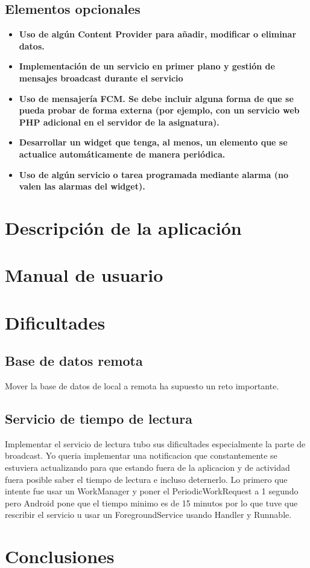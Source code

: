 \documentclass[a4paper,10pt]{report}
\begin{document}
    \section{Elementos opcionales}
      \begin{itemize}
        \item \textbf{Uso de algún Content Provider para añadir, modificar o eliminar datos.}
        \item \textbf{Implementación de un servicio en primer plano y gestión de mensajes broadcast durante el servicio}
        \item \textbf{Uso de mensajería FCM. Se debe incluir alguna forma de que se pueda probar de forma externa (por ejemplo, con un servicio web PHP adicional en el servidor de la asignatura).}
        \item \textbf{Desarrollar un widget que tenga, al menos, un elemento que se actualice automáticamente de manera periódica.}
        \item \textbf{Uso de algún servicio o tarea programada mediante alarma (no valen las alarmas del widget).}
      \end{itemize}
  \chapter{Descripción de la aplicación}
  \chapter{Manual de usuario}
  \chapter{Dificultades}
    \section{Base de datos remota}
      Mover la base de datos de local a remota ha supuesto un reto importante.
      
    \section{Servicio de tiempo de lectura}
      Implementar el servicio de lectura tubo sus dificultades especialmente la parte de broadcast.
      Yo queria implementar una notificacion que constantemente se estuviera actualizando para que estando fuera de la aplicacion y de actividad fuera posible saber el tiempo de lectura e incluso deternerlo.
      Lo primero que intente fue usar un WorkManager y poner el PeriodicWorkRequest a 1 segundo pero Android pone que el tiempo minimo es de 15 minutos por lo que tuve que rescribir el servicio u usar un ForegroundService usando Handler y Runnable.

  \chapter{Conclusiones}
\end{document}
